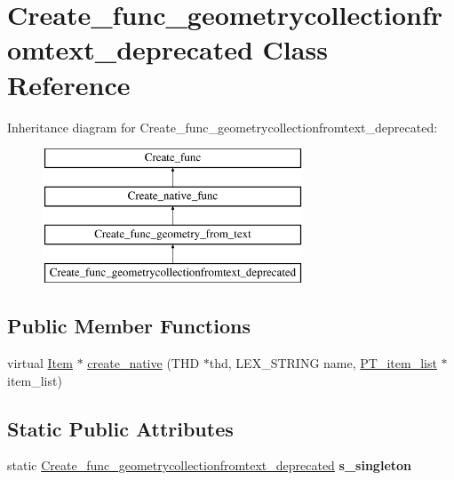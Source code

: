 \hypertarget{classCreate__func__geometrycollectionfromtext__deprecated}{}\section{Create\+\_\+func\+\_\+geometrycollectionfromtext\+\_\+deprecated Class Reference}
\label{classCreate__func__geometrycollectionfromtext__deprecated}
Inheritance diagram for Create\+\_\+func\+\_\+geometrycollectionfromtext\+\_\+deprecated\+:\begin{figure}[H]
\begin{center}
\leavevmode
\includegraphics[height=4.000000cm]{classCreate__func__geometrycollectionfromtext__deprecated}
\end{center}
\end{figure}
\subsection*{Public Member Functions}
\begin{DoxyCompactItemize}
\item 
virtual \mbox{\hyperlink{classItem}{Item}} $\ast$ \mbox{\hyperlink{classCreate__func__geometrycollectionfromtext__deprecated_a82b818db18364fb0619ad2ca6a1551ce}{create\+\_\+native}} (T\+HD $\ast$thd, L\+E\+X\+\_\+\+S\+T\+R\+I\+NG name, \mbox{\hyperlink{classPT__item__list}{P\+T\+\_\+item\+\_\+list}} $\ast$item\+\_\+list)
\end{DoxyCompactItemize}
\subsection*{Static Public Attributes}
\begin{DoxyCompactItemize}
\item 
\mbox{\label{classCreate__func__geometrycollectionfromtext__deprecated_a4f09a1a808ee9e55902f445f30e40751}} 
static \mbox{\hyperlink{classCreate__func__geometrycollectionfromtext__deprecated}{Create\+\_\+func\+\_\+geometrycollectionfromtext\+\_\+deprecated}} {\bfseries s\+\_\+singleton}
\end{DoxyCompactItemize}
